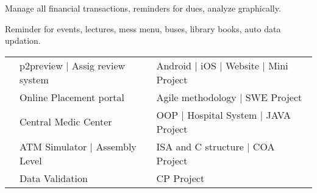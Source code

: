 \documentclass[a4paper]{deedy-resume} %
\begin{document}
\begin{minipage}[t]{0.66\textwidth}
    \sectionspace %
    
    
    Manage all financial transactions, reminders for dues, analyze graphically.
    
    \sectionspace %
    
    
    Reminder for events, lectures, mess menu, buses, library books, auto data updation.
    
    
    
    
    \sectionspace %
    
    
    \sectionspace %
    
    \begin{tabular}{rll}
    \textbullet{}    & p2preview | Assig review system & Android | iOS | Website | Mini Project\\
    \textbullet{}	 & Online Placement portal & Agile methodology | SWE Project\\
    \textbullet{}    & Central Medic Center & OOP | Hospital System | JAVA Project\\
    \textbullet{}	 & ATM Simulator | Assembly Level & ISA and C structure | COA Project\\
    \textbullet{}	 & Data Validation & CP Project\\
    \end{tabular}
    

\end{minipage}
\end{document}
